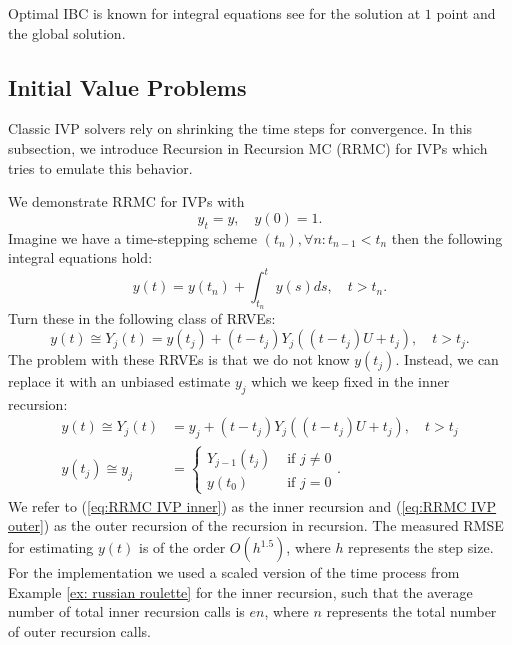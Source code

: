 \documentclass[a4paper,12pt]{article}
\begin{document}
\begin{related}
  Optimal IBC is known for integral equations see \cite{heinrich_monte_1998}
  for the solution at $1$ point and the global solution.
\end{related}

\subsection{Initial Value Problems}
Classic IVP solvers rely on shrinking the time steps for
convergence. In this subsection, we introduce
Recursion in Recursion MC (RRMC) for IVPs which tries to emulate
this behavior.


\begin{example}[RRMC $y_t=y$] \label{ex:RRMC IVP}
  We demonstrate RRMC for IVPs with
  \begin{equation}
    y_t = y, \quad y(0) = 1.
  \end{equation}
  Imagine we have a time-stepping scheme $(t_{n}), \forall n: t_{n-1} < t_{n}$
  then the following integral equations hold:
  \begin{equation}
    y(t)= y(t_{n}) + \int_{t_{n}}^{t}y(s)ds , \quad t>t_{n}.
  \end{equation}
  Turn these in the following class of RRVEs:
  \begin{equation}
    y(t) \cong Y_{j}(t) = y(t_{j}) + (t-t_{j})Y_{j}((t-t_{j})U+t_{j}), \quad t>t_{j}.
  \end{equation}
  The problem with these RRVEs is that we do not know $y(t_{j})$.
  Instead, we can replace it with an unbiased estimate $y_{j}$
  which we keep fixed in the inner recursion:
  \begin{align}
    \label{eq:RRMC IVP inner}
    y(t) \cong Y_{j}(t)  & = y_{j} + (t-t_{j})Y_{j}((t-t_{j})U+t_{j}), \quad t>t_{j} \\
    y(t_{j}) \cong y_{j} & = \begin{cases}
                               Y_{j-1}(t_{j}) & \text{ if } j \neq 0 \\
                               y(t_{0})       & \text{ if } j = 0
                             \end{cases}.
    \label{eq:RRMC IVP outer}
  \end{align}
  We refer to (\ref{eq:RRMC IVP inner}) as the inner recursion and
  (\ref{eq:RRMC IVP outer}) as the outer recursion of the recursion in
  recursion.
  The measured RMSE for estimating $y(t)$ is of the order
  $O\left(h^{1.5} \right)$, where $h$ represents
  the step size. For the implementation we used a scaled version
  of the time process from Example \ref{ex: russian roulette}
  for the inner recursion, such that the average number of total inner recursion calls
  is $e n$, where $n$ represents the total number of outer recursion calls.
\end{example}
\end{document}
